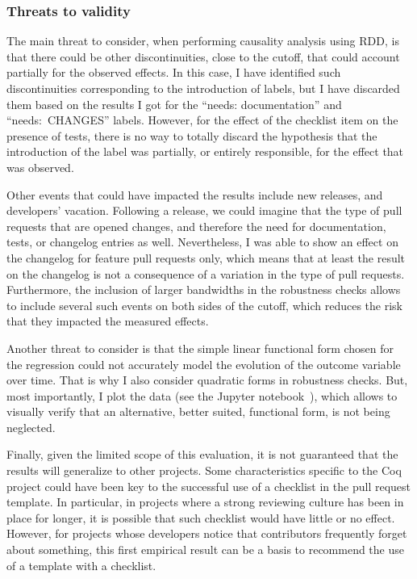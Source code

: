 \subsubsection{Threats to validity}

The main threat to consider, when performing causality analysis using RDD, is that there could be other discontinuities, close to the cutoff, that could account partially for the observed effects.
In this case, I have identified such discontinuities corresponding to the introduction of labels, but I have discarded them based on the results I got for the ``needs: documentation'' and ``needs: CHANGES'' labels.
However, for the effect of the checklist item on the presence of tests, there is no way to totally discard the hypothesis that the introduction of the label was partially, or entirely responsible, for the effect that was observed.

Other events that could have impacted the results include new releases, and developers' vacation.
Following a release, we could imagine that the type of pull requests that are opened changes, and therefore the need for documentation, tests, or changelog entries as well.
Nevertheless, I was able to show an effect on the changelog for feature pull requests only, which means that at least the result on the changelog is not a consequence of a variation in the type of pull requests.
Furthermore, the inclusion of larger bandwidths in the robustness checks allows to include several such events on both sides of the cutoff, which reduces the risk that they impacted the measured effects.

Another threat to consider is that the simple linear functional form chosen for the regression could not accurately model the evolution of the outcome variable over time.
That is why I also consider quadratic forms in robustness checks.
But, most importantly, I plot the data (see the Jupyter notebook~\cite{zimmermann2019templates}), which allows to visually verify that an alternative, better suited, functional form, is not being neglected.

Finally, given the limited scope of this evaluation, it is not guaranteed that the results will generalize to other projects.
Some characteristics specific to the Coq project could have been key to the successful use of a checklist in the pull request template.
In particular, in projects where a strong reviewing culture has been in place for longer, it is possible that such checklist would have little or no effect.
However, for projects whose developers notice that contributors frequently forget about something, this first empirical result can be a basis to recommend the use of a template with a checklist.

